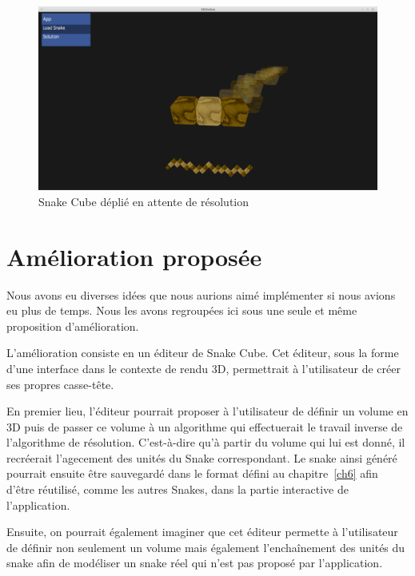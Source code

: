 \begin{figure}[h]
 \centering
 \includegraphics[scale=0.3,keepaspectratio=true]{img/screenShot1.png}
 \caption{Snake Cube déplié en attente de résolution}
 \label{screenShot1}
\end{figure}

\section{Amélioration proposée}
Nous avons eu diverses idées que nous aurions aimé implémenter si nous avions eu plus de temps. Nous les avons regroupées ici sous une seule et même proposition d'amélioration.

L'amélioration consiste en un éditeur de Snake Cube. Cet éditeur, sous la forme d'une interface dans le contexte de rendu 3D, permettrait à l'utilisateur de créer ses propres casse-tête.

En premier lieu, l'éditeur pourrait proposer à l'utilisateur de définir un volume en 3D puis de passer ce volume à un algorithme qui effectuerait le travail inverse de l'algorithme de résolution. C'est-à-dire qu'à partir du volume qui lui est donné, il recréerait l'agecement des unités du Snake correspondant. Le snake ainsi généré pourrait ensuite être sauvegardé dans le format défini au chapitre~\ref{ch6} afin d'être réutilisé, comme les autres Snakes, dans la partie interactive de l'application.

Ensuite, on pourrait également imaginer que cet éditeur permette à l'utilisateur de définir non seulement un volume mais également l'enchaînement des unités du snake afin de modéliser un snake réel qui n'est pas proposé par l'application.
